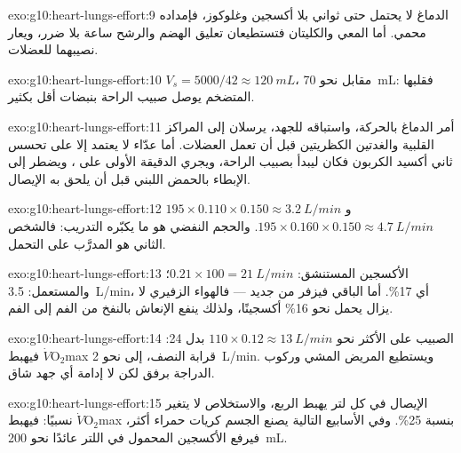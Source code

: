 \begin{solution}{exo:g10:heart-lungs-effort:9}
الدماغ لا يحتمل حتى ثواني بلا أكسجين وغلوكوز، فإمداده محمي. أما المعي
والكليتان فتستطيعان تعليق الهضم والرشح ساعة بلا ضرر، ويعار نصيبهما
للعضلات.
\end{solution}

\begin{solution}{exo:g10:heart-lungs-effort:10}
$V_s = 5000/42 \approx \qty{120}{mL}$، مقابل نحو \qty{70}{mL}: فقلبها
المتضخم يوصل صبيب الراحة بنبضات أقل بكثير.
\end{solution}

\begin{solution}{exo:g10:heart-lungs-effort:11}
أمر الدماغ بالحركة، واستباقه للجهد، يرسلان إلى المراكز القلبية
والغدتين الكظريتين قبل أن تعمل العضلات. أما عدّاء لا يعتمد إلا على
تحسس ثاني أكسيد الكربون فكان ليبدأ بصبيب الراحة، ويجري الدقيقة الأولى
على ، ويضطر إلى الإبطاء بالحمض اللبني قبل أن يلحق به الإيصال.
\end{solution}

\begin{solution}{exo:g10:heart-lungs-effort:12}
$195 \times 0.110 \times 0.150 \approx \qty{3.2}{L/min}$ و
$195 \times 0.160 \times 0.150 \approx \qty{4.7}{L/min}$. والحجم
النفضي هو ما يكبّره التدريب: فالشخص الثاني هو المدرَّب على التحمل.
\end{solution}

\begin{solution}{exo:g10:heart-lungs-effort:13}
الأكسجين المستنشق: $0.21 \times 100 = \qty{21}{L/min}$؛ والمستعمل:
\qty{3.5}{L/min}، أي 17\%. أما الباقي فيزفر من جديد --- فالهواء
الزفيري لا يزال يحمل نحو 16\% أكسجينًا، ولذلك ينفع الإنعاش بالنفخ من
الفم إلى الفم.
\end{solution}

\begin{solution}{exo:g10:heart-lungs-effort:14}
الصبيب على الأكثر نحو $110 \times 0.12 \approx \qty{13}{L/min}$ بدل
24: فيهبط $\dot V\!\mathrm{O_2}$max قرابة النصف، إلى نحو
\qty{2}{L/min}. ويستطيع المريض المشي وركوب الدراجة برفق لكن لا إدامة
أي جهد شاق.
\end{solution}

\begin{solution}{exo:g10:heart-lungs-effort:15}
الإيصال في كل لتر يهبط الربع، والاستخلاص لا يتغير نسبيًا:
فيهبط $\dot V\!\mathrm{O_2}$max بنسبة 25\%. وفي الأسابيع التالية يصنع
الجسم كريات حمراء أكثر، فيرفع الأكسجين المحمول في اللتر عائدًا نحو
\qty{200}{mL}.
\end{solution}

